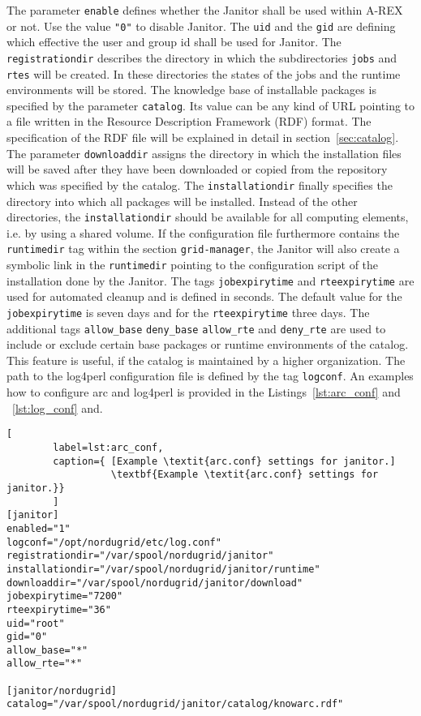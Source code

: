 The parameter \texttt{enable} defines whether the Janitor shall be used within A-REX or not. Use the value \texttt{"0"} to disable Janitor. The
\texttt{uid} and the \texttt{gid} are defining which effective the user and group id shall be used for Janitor. 
The \texttt{registrationdir} describes the directory in which the subdirectories \texttt{jobs} and \texttt{rtes} will be created.
In these directories the states of the jobs and the runtime environments will be stored. 
The knowledge base of installable packages is specified by the parameter \texttt{catalog}. 
Its value can be any kind of URL pointing to a file written in the Resource Description Framework (RDF) format.
The specification of the RDF file will be explained in detail in section~\ref{sec:catalog}.
The parameter \texttt{downloaddir} assigns the directory in which the installation files will be saved after they have been 
downloaded or copied from the repository which was specified by the catalog. The \texttt{installationdir} finally specifies the
directory into which all packages will be installed. Instead of the other directories, the \texttt{installationdir} should be 
available for all computing elements, i.e. by using a shared volume.
If the configuration file furthermore contains the \texttt{runtimedir} tag within the section \texttt{grid-manager}, the Janitor will also
create a symbolic link in the \texttt{runtimedir} pointing to the configuration script of the installation done by the Janitor.
The tags \texttt{jobexpirytime} and \texttt{rteexpirytime} are used for automated cleanup and is defined in seconds.
The default value for the \texttt{jobexpirytime} is seven days and for the \texttt{rteexpirytime} three days. 
The additional tags \texttt{allow\_base} \texttt{deny\_base} \texttt{allow\_rte} and \texttt{deny\_rte} are used to include
or exclude certain base packages or runtime environments of the catalog. This feature is useful, if the catalog is maintained by
a higher organization.
The path to the log4perl configuration file is defined by the tag \texttt{logconf}.
An examples how to configure arc and log4perl is provided in the Listings~\ref{lst:arc_conf} and ~\ref{lst:log_conf} and.

\begin{lstlisting}[
        label=lst:arc_conf,
        caption={ [Example \textit{arc.conf} settings for janitor.]
                  \textbf{Example \textit{arc.conf} settings for janitor.}}
        ]
[janitor]
enabled="1"
logconf="/opt/nordugrid/etc/log.conf"
registrationdir="/var/spool/nordugrid/janitor"
installationdir="/var/spool/nordugrid/janitor/runtime"
downloaddir="/var/spool/nordugrid/janitor/download"
jobexpirytime="7200"
rteexpirytime="36"
uid="root"
gid="0"
allow_base="*"
allow_rte="*"

[janitor/nordugrid]
catalog="/var/spool/nordugrid/janitor/catalog/knowarc.rdf"
\end{lstlisting}

